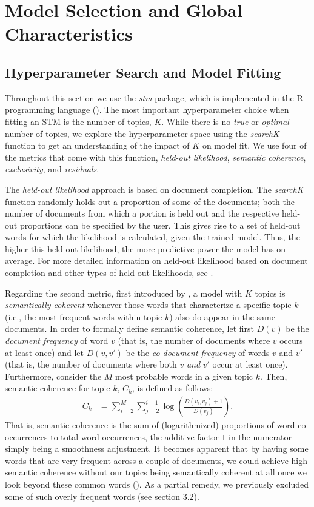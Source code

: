 \section{Model Selection and Global Characteristics}

\subsection{Hyperparameter Search and Model Fitting}

Throughout this section we use the \textit{stm} package, which is implemented in the R programming language (\citealp{stm}). The most important hyperparameter choice when fitting an STM is the number of topics, $K$. While there is no \textit{true} or \textit{optimal} number of topics, we explore the hyperparameter space using the \textit{searchK} function to get an understanding of the impact of $K$ on model fit. We use four of the metrics that come with this function, \textit{held-out likelihood}, \textit{semantic coherence}, \textit{exclusivity}, and \textit{residuals}.

The \textit{held-out likelihood} approach is based on document completion. The \textit{searchK} function randomly holds out a proportion of some of the documents; both the number of documents from which a portion is held out and the respective held-out proportions can be specified by the user. This gives rise to a set of held-out words for which the likelihood is calculated, given the trained model. Thus, the higher this held-out likelihood, the more predictive power the model has on average. For more detailed information on held-out likelihood based on document completion and other types of held-out likelihoods, see \cite{wallach2009evaluation}.

Regarding the second metric, first introduced by \cite{mimno2011optimizing}, a model with $K$ topics is \textit{semantically coherent} whenever those words that characterize a specific topic $k$ (i.e., the most frequent words within topic $k$) also do appear in the same documents. In order to formally define semantic coherence, let first $D(v)$ be the \textit{document frequency} of word $v$ (that is, the number of documents where $v$ occurs at least once) and let $D(v, v')$ be the \textit{co-document frequency} of words $v$ and $v'$ (that is, the number of documents where both $v$ \textit{and} $v'$ occur at least once). Furthermore, consider the $M$ most probable words in a given topic $k$. Then, semantic coherence for topic $k$, $C_{k}$, is defined as follows:
\begin{align*}
C_{k} &= \sum_{i=2}^{M}\sum_{j=2}^{i-1}\log(\frac{D(v_{i}, v_{j})+1}{D(v_{j})}).
\end{align*}
That is, semantic coherence is the sum of (logarithmized) proportions of word co-occurrences to total word occurrences, the additive factor $1$ in the numerator simply being a smoothness adjustment. It becomes apparent that by having some words that are very frequent across a couple of documents, we could achieve high semantic coherence without our topics being semantically coherent at all once we look beyond these common words (\citealp{stm, mimno2011optimizing}). As a partial remedy, we previously excluded some of such overly frequent words (see section 3.2).

